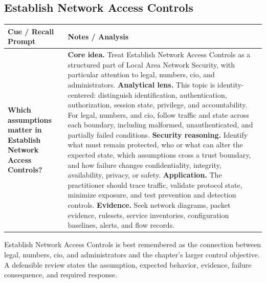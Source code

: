 \documentclass[11pt]{article}
\newcommand{\CornellHeader}{%
\rowcolor{Navy}\color{white}\bfseries Cue / Recall Prompt & \color{white}\bfseries Notes / Analysis\\\hline}
\newcommand{\CornellRow}[2]{%
\cellcolor{CueGray}\RaggedRight\textbf{#1} & \RaggedRight #2\\\hline}
\begin{document}
\subsection*{Establish Network Access Controls}
\begin{longtable}{>{\RaggedRight\arraybackslash}p{}|>{\RaggedRight\arraybackslash}p{}}
\CornellHeader
\CornellRow{Which assumptions matter in Establish Network Access Controls?}{\textbf{Core idea.} Treat Establish Network Access Controls as a structured part of Local Area Network Security, with particular attention to legal, numbers, cio, and administrators. \textbf{Analytical lens.} This topic is identity-centered: distinguish identification, authentication, authorization, session state, privilege, and accountability. For legal, numbers, and cio, follow traffic and state across each boundary, including malformed, unauthenticated, and partially failed conditions. \textbf{Security reasoning.} Identify what must remain protected, who or what can alter the expected state, which assumptions cross a trust boundary, and how failure changes confidentiality, integrity, availability, privacy, or safety. \textbf{Application.} The practitioner should trace traffic, validate protocol state, minimize exposure, and test prevention and detection controls. \textbf{Evidence.} Seek network diagrams, packet evidence, rulesets, service inventories, configuration baselines, alerts, and flow records.}
\end{longtable}
\begin{topicsummary}
Establish Network Access Controls is best remembered as the connection between legal, numbers, cio, and administrators and the chapter's larger control objective. A defensible review states the assumption, expected behavior, evidence, failure consequence, and required response.
\end{topicsummary}
\end{document}
